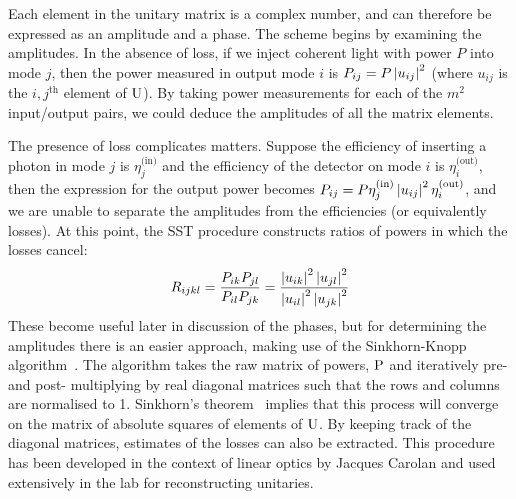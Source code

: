 Each element in the unitary matrix is a complex number, and can therefore be
expressed as an amplitude and a phase. The scheme begins by examining the
amplitudes. In the absence of loss, if we inject coherent light with power \(P\)
into mode \(j\), then the power measured in output mode \(i\) is \(P_{ij} =
P \left|u_{ij}\right|^{2}\) (where \(u_{ij}\) is the \(i,j^{\text{th}}\) element of
\(\mathrm{U}\)). By taking power measurements for each of the \(m^{2}\)
input/output pairs, we could deduce the amplitudes of all the matrix elements.

The presence of loss complicates matters. Suppose the efficiency of inserting a
photon in mode \(j\) is \(\eta_{j}^{\text{(in)}}\) and the efficiency of the
detector on mode \(i\) is \(\eta_{i}^{\text{(out)}}\), then the expression for
the output power becomes \(P_{ij} = P \eta_{j}^{\text{(in)}} \left|u_{ij}\right|^{2}
\eta_{i}^{\text{(out)}}\), and we are unable to separate the amplitudes from the
efficiencies (or equivalently losses). At this point, the SST procedure
constructs ratios of powers in which the losses cancel:
\begin{equation}
  \label{eq:ratios}
  R_{ijkl} = \frac{P_{ik} P_{jl}}{P_{il} P_{jk}} = \frac{\left|u_{ik}\right|^{2}
  \left|u_{jl}\right|^{2}}{\left|u_{il}\right|^{2} \left|u_{jk}\right|^{2}}
\end{equation}
These become useful later in discussion of the phases, but for determining the
amplitudes there is an easier approach, making use of the Sinkhorn-Knopp
algorithm~\cite{sinkhorn-knopp}. The algorithm takes the raw matrix of powers,
\(\mathrm{P}\) and iteratively pre- and post- multiplying by real diagonal matrices
such that the rows and columns are normalised to 1. Sinkhorn's
theorem~\cite{sinkhorn} implies that this process will converge on the matrix
of absolute squares of elements of \(\mathrm{U}\). By keeping track of the diagonal
matrices, estimates of the losses can also be extracted. This procedure has been
developed in the context of linear optics by Jacques Carolan and used
extensively in the lab for reconstructing unitaries.

